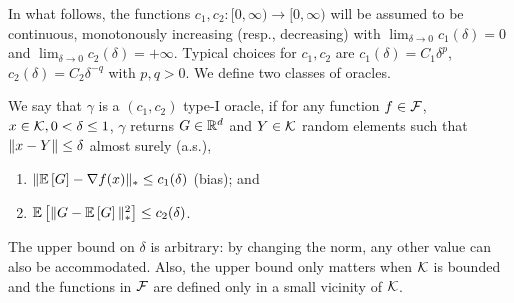 In what follows, the functions $c_1,c_2:[0,\infty)\to [0,\infty)$ will be assumed to be continuous,
monotonously increasing (resp., decreasing) with
$\lim_{\delta\to  0} c_1(\delta)=0$ and $\lim_{\delta\to 0} c_2(\delta)=+\infty$.
Typical choices for $c_1,c_2$ are $c_1(\delta) = C_1 \delta^p$, $c_2(\delta) = C_2\delta^{-q}$ with $p,q>0$.
We define two classes of oracles. 
\begin{definition}
\label{def:oracle1}
We say that $\gamma$ is a  $(c_1,c_2)$ type-I oracle, if for any function $f\in \mathcal{F}$,
$x\in \mathcal{K},0<\delta\le 1$, $\gamma$ returns $G\in \mathbb{R}^d$ and  $Y\in \mathcal{K}$ random elements such that
$\|x-Y\|\le \delta$ almost surely (a.s.),
\vspace{-0.2cm}
\begin{enumerate}
\item $\| \mathbb{E}\left[G\right]  - \nabla f(x)  \|_* \le c_1(\delta) $ (bias); and
\item $\mathbb{E}\left[\| G -  \mathbb{E}\left[G\right] \|_*^2\right] \le c_2(\delta)$.
\end{enumerate}
\end{definition}
The upper bound on $\delta$ is arbitrary: by changing the norm, any other value can also be accommodated. Also, the upper bound only matters when $\mathcal{K}$ is bounded and the functions in $\mathcal{F}$ are defined only in a small vicinity of $\mathcal{K}$.

